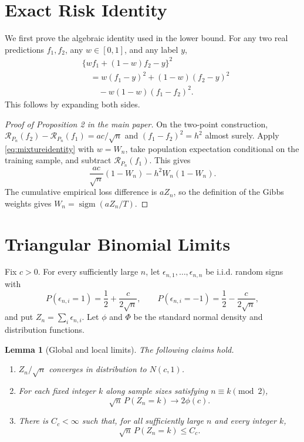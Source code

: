 \documentclass[twoside]{article}
\newtheorem{lemma}[theorem]{Lemma}
\newcommand{\R}{\mathcal R}
\newcommand{\sigm}{\operatorname{sigm}}
\begin{document}
\runningauthor{}

\section{Exact Risk Identity}

We first prove the algebraic identity used in the lower bound. For any two real predictions $f_1,f_2$, any $w\in[0,1]$, and any label $y$,
\begin{align}
&\{w f_1+(1-w)f_2-y\}^2\nonumber\\
&\quad=w(f_1-y)^2+(1-w)(f_2-y)^2\nonumber\\
&\qquad-w(1-w)(f_1-f_2)^2.
\label{eq:mixtureidentity}
\end{align}
This follows by expanding both sides.

\begin{proof}[Proof of Proposition 2 in the main paper]
On the two-point construction, $\R_{P_n}(f_2)-\R_{P_n}(f_1)=ac/\sqrt n$ and $(f_1-f_2)^2=h^2$ almost surely. Apply \eqref{eq:mixtureidentity} with $w=W_n$, take population expectation conditional on the training sample, and subtract $\R_{P_n}(f_1)$. This gives
\[
\frac{ac}{\sqrt n}(1-W_n)-h^2W_n(1-W_n).
\]
The cumulative empirical loss difference is $aZ_n$, so the definition of the Gibbs weights gives $W_n=\sigm(aZ_n/T)$.
\end{proof}

\section{Triangular Binomial Limits}

Fix $c>0$. For every sufficiently large $n$, let $\epsilon_{n,1},\ldots,\epsilon_{n,n}$ be i.i.d. random signs with
\[
P(\epsilon_{n,i}=1)=\frac12+\frac{c}{2\sqrt n},
\qquad
P(\epsilon_{n,i}=-1)=\frac12-\frac{c}{2\sqrt n},
\]
and put $Z_n=\sum_i\epsilon_{n,i}$. Let $\phi$ and $\Phi$ be the standard normal density and distribution functions.

\begin{lemma}[Global and local limits]
\label{lem:binomial}
The following claims hold.
\begin{enumerate}
\item $Z_n/\sqrt n$ converges in distribution to $N(c,1)$.
\item For each fixed integer $k$ along sample sizes satisfying $n\equiv k\pmod 2$,
\[
\sqrt n\,P(Z_n=k)\longrightarrow2\phi(c).
\]
\item There is $C_c<\infty$ such that, for all sufficiently large $n$ and every integer $k$,
\[
\sqrt n\,P(Z_n=k)\leq C_c.
\]
\end{enumerate}
\end{lemma}
\end{document}
